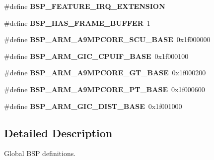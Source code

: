 \begin{DoxyCompactItemize}
\item 
\mbox{\label{bsps_2arm_2realview-pbx-a9_2include_2bsp_8h_a5d7d631d3a14b7554160f14eb42f351b}} 
\#define {\bfseries B\+S\+P\+\_\+\+F\+E\+A\+T\+U\+R\+E\+\_\+\+I\+R\+Q\+\_\+\+E\+X\+T\+E\+N\+S\+I\+ON}
\item 
\mbox{\label{bsps_2arm_2realview-pbx-a9_2include_2bsp_8h_a18988f05911c2a1adcea89019029280b}} 
\#define {\bfseries B\+S\+P\+\_\+\+H\+A\+S\+\_\+\+F\+R\+A\+M\+E\+\_\+\+B\+U\+F\+F\+ER}~1
\item 
\mbox{\label{bsps_2arm_2realview-pbx-a9_2include_2bsp_8h_a180004170c65ed2eaa91050be70aa480}} 
\#define {\bfseries B\+S\+P\+\_\+\+A\+R\+M\+\_\+\+A9\+M\+P\+C\+O\+R\+E\+\_\+\+S\+C\+U\+\_\+\+B\+A\+SE}~0x1f000000
\item 
\mbox{\label{bsps_2arm_2realview-pbx-a9_2include_2bsp_8h_a82979270e5d617859b19ad1830434bb6}} 
\#define {\bfseries B\+S\+P\+\_\+\+A\+R\+M\+\_\+\+G\+I\+C\+\_\+\+C\+P\+U\+I\+F\+\_\+\+B\+A\+SE}~0x1f000100
\item 
\mbox{\label{bsps_2arm_2realview-pbx-a9_2include_2bsp_8h_afdfd032028e40b1b0e2fcdbcebf24250}} 
\#define {\bfseries B\+S\+P\+\_\+\+A\+R\+M\+\_\+\+A9\+M\+P\+C\+O\+R\+E\+\_\+\+G\+T\+\_\+\+B\+A\+SE}~0x1f000200
\item 
\mbox{\label{bsps_2arm_2realview-pbx-a9_2include_2bsp_8h_a238a3535d48de7205020be9a4acc8df5}} 
\#define {\bfseries B\+S\+P\+\_\+\+A\+R\+M\+\_\+\+A9\+M\+P\+C\+O\+R\+E\+\_\+\+P\+T\+\_\+\+B\+A\+SE}~0x1f000600
\item 
\mbox{\label{bsps_2arm_2realview-pbx-a9_2include_2bsp_8h_a74b3234f20bb7c846a4b35c68bbb0703}} 
\#define {\bfseries B\+S\+P\+\_\+\+A\+R\+M\+\_\+\+G\+I\+C\+\_\+\+D\+I\+S\+T\+\_\+\+B\+A\+SE}~0x1f001000
\end{DoxyCompactItemize}


\subsection{Detailed Description}
Global B\+SP definitions. 

